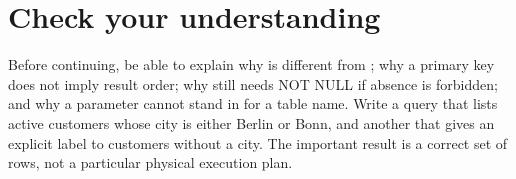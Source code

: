 
\section{Check your understanding}

Before continuing, be able to explain why  is different from ; why a primary key does not imply result order; why  still needs NOT NULL if absence is forbidden; and why a parameter cannot stand in for a table name. Write a query that lists active customers whose city is either Berlin or Bonn, and another that gives an explicit label to customers without a city. The important result is a correct set of rows, not a particular physical execution plan.
